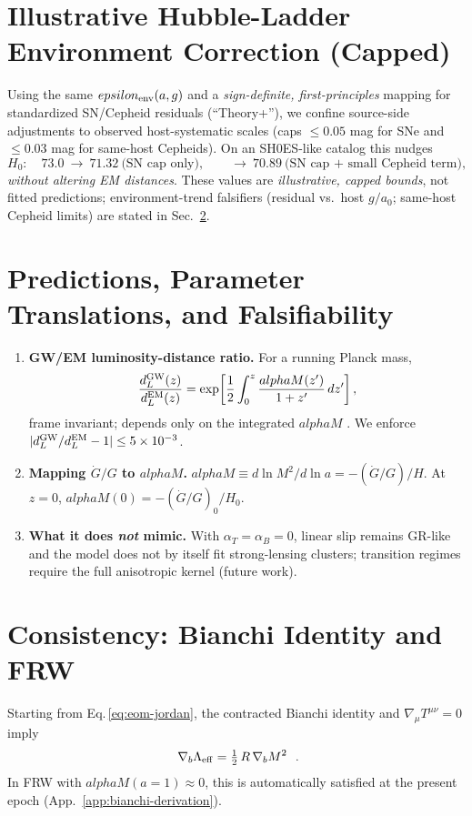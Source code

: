 \documentclass[aps,prd,onecolumn,superscriptaddress,nofootinbib]{revtex4-2}
\def\alphaM{alphaM}%
\def\eps{epsilon}%
\def\boxed#1{#1}%
\newcommand{\alphaM}{\alpha_M}
\newcommand{\eps}{\varepsilon}
\begin{document}
\section{Illustrative Hubble-Ladder Environment Correction (Capped)}
\label{sec:h0-illustration}
Using the same $\eps_{\rm env}(a,g)$ and a \emph{sign-definite, first-principles} mapping for standardized SN/Cepheid residuals (``Theory+''), we confine source-side adjustments to observed host-systematic scales (caps $\le 0.05$ mag for SNe and $\le 0.03$ mag for same-host Cepheids). On an SH0ES-like catalog this nudges
\begin{equation}
H_0:\quad 73.0 \ \to\ 71.32\ \text{(SN cap only)},\qquad \to\ 70.89\ \text{(SN cap + small Cepheid term)},
\end{equation}
\emph{without altering EM distances}. These values are \emph{illustrative, capped bounds}, not fitted predictions; environment-trend falsifiers (residual vs.\ host $g/a_0$; same-host Cepheid limits) are stated in Sec.~\ref{sec:predictions}.

\section{Predictions, Parameter Translations, and Falsifiability}
\label{sec:predictions}
\begin{enumerate}[leftmargin=1.3em]
\item \textbf{GW/EM luminosity-distance ratio.} For a running Planck mass,
\begin{equation}
\frac{d_L^{\rm GW}(z)}{d_L^{\rm EM}(z)} = \exp\!\left[ \frac{1}{2}\int_{0}^{z} \frac{\alphaM(z')}{1+z'}\,dz' \right],
\end{equation}
frame invariant; depends only on the integrated $\alphaM$ \cite{LombriserTaylor2016}. We enforce $|d_L^{\rm GW}/d_L^{\rm EM}-1|\le 5\times10^{-3}$.
\item \textbf{Mapping $\dot G/G$ to $\alphaM$.}
$\alphaM \equiv d\ln M^2/d\ln a = -(\dot G/G)/H$. At $z=0$, $\alphaM(0)=-(\dot G/G)_0/H_0$.
\item \textbf{What it does \emph{not} mimic.} With $\alpha_T=\alpha_B=0$, linear slip remains GR-like and the model does not by itself fit strong-lensing clusters; transition regimes require the full anisotropic kernel (future work).
\end{enumerate}

\section{Consistency: Bianchi Identity and FRW}
\label{sec:bianchi}
Starting from Eq.\,\eqref{eq:eom-jordan}, the contracted Bianchi identity and $\nabla_\mu T^{\mu\nu}=0$ imply
\begin{equation}
\boxed{\ \nabla_b \Lambda_{\rm eff} = \tfrac{1}{2}\,R\,\nabla_b M^2\ }\ .
\label{eq:bianchi-consistency}
\end{equation}
In FRW with $\alphaM(a{=}1)\approx 0$, this is automatically satisfied at the present epoch (App.~\ref{app:bianchi-derivation}).
\end{document}
